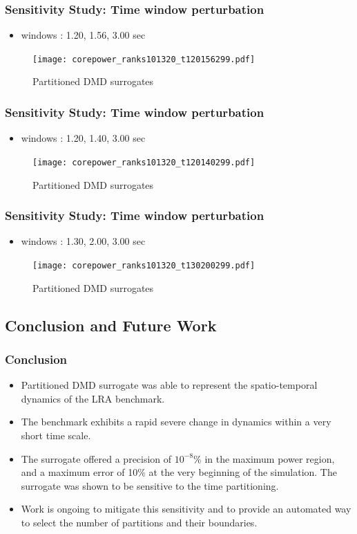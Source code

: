\documentclass[fleqn]{beamer}
\begin{document}
\begin{frame}
\frametitle{Sensitivity Study: Time window perturbation}
\begin{itemize}
 \item windows : 1.20, 1.56, 3.00 sec
\end{itemize}
\begin{figure}[ht]
\texttt{[image: corepower\_ranks101320\_t120156299.pdf]}
\caption{Partitioned DMD surrogates}
\end{figure}
\end{frame}

\begin{frame}
\frametitle{Sensitivity Study: Time window perturbation}
\begin{itemize}
 \item windows : 1.20, 1.40, 3.00 sec
\end{itemize}
\begin{figure}[ht]
\texttt{[image: corepower\_ranks101320\_t120140299.pdf]}
\caption{Partitioned DMD surrogates}
\end{figure}
\end{frame}

\begin{frame}
\frametitle{Sensitivity Study: Time window perturbation}
\begin{itemize}
 \item windows : 1.30, 2.00, 3.00 sec
\end{itemize}
\begin{figure}[ht]
\texttt{[image: corepower\_ranks101320\_t130200299.pdf]}
\caption{Partitioned DMD surrogates}
\end{figure}
\end{frame}



   \begin{frame}
   \section{Conclusion and Future Work }
   \frametitle{Conclusion}
   \begin{itemize}
   \item Partitioned DMD surrogate was able to represent the spatio-temporal dynamics of the LRA benchmark.
   \item The benchmark exhibits a rapid severe change in dynamics within a very short time scale.
   \item The surrogate offered a precision of $10^{-8}\%$ in the maximum power region, and a maximum error of 10\% at the very beginning of the simulation. The surrogate was shown to be sensitive to the time partitioning. 
   \item Work is ongoing to mitigate this sensitivity and to provide an automated way to select the number of partitions and their boundaries.
   \end{itemize}
      \end{frame}
\end{document}
